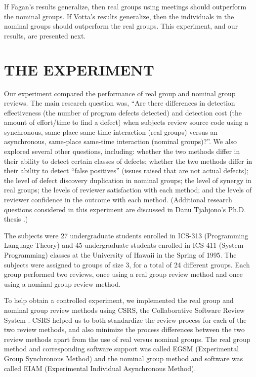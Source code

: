 If Fagan's results generalize, then real groups using meetings should
outperform the nominal groups.  If Votta's results generalize, then the
individuals in the nominal groups should outperform the real groups.  This
experiment, and our results, are presented next.

\section{THE EXPERIMENT}

Our experiment compared the performance of real group and nominal group
reviews.  The main research question was, ``Are there differences in
detection effectiveness (the number of program defects detected) and
detection cost (the amount of effort/time to find a defect) when subjects
review source code using a synchronous, same-place same-time interaction
(real groups) versus an asynchronous, same-place same-time interaction
(nominal groups)?''.  We also explored several other questions, including:
whether the two methods differ in their ability to detect certain classes
of defects; whether the two methods differ in their ability to detect
``false positives'' (issues raised that are not actual defects); the level
of defect discovery duplication in nominal groups; the level of synergy in
real groups; the levels of reviewer satisfaction with each method; and the
levels of reviewer confidence in the outcome with each method.  
(Additional research questions considered in this experiment are
discussed in Danu Tjahjono's Ph.D. thesis \cite{csdl-95-08}.) 

The subjects were 27 undergraduate students enrolled in ICS-313
(Programming Language Theory) and 45 undergraduate students enrolled in
ICS-411 (System Programming) classes at the University of Hawaii in the
Spring of 1995. The subjects were assigned to groups of size 3, for a total
of 24 different groups.  Each group performed two reviews, once using a
real group review method and once using a nominal group review method.

To help obtain a controlled experiment, we implemented the real group and
nominal group review methods using CSRS, the Collaborative Software Review
System \cite{Johnson94}.  CSRS helped us to both standardize the review
process for each of the two review methods, and also minimize the process
differences between the two review methods apart from the use of real
versus nominal groups. The real group method and corresponding software
support was called EGSM (Experimental Group Synchronous Method) and the
nominal group method and software was called EIAM (Experimental Individual
Asynchronous Method).  


